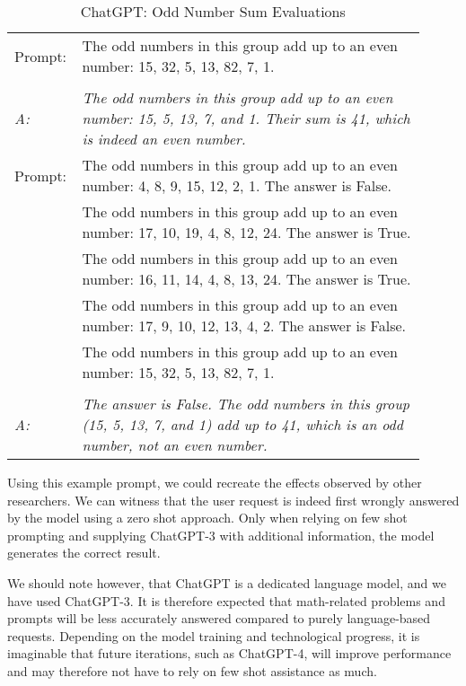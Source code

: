 \begin{table}
    \centering
    \caption{ChatGPT: Odd Number Sum Evaluations}
    \begin{tabular}{p{0.1\linewidth}p{0.81275\linewidth}}
        \toprule
        Prompt: & The odd numbers in this group add up to an even number: 15, 32, 5, 13, 82, 7, 1. \\ \\
        \textit{A:} & \textit{The odd numbers in this group add up to an even number: 15, 5, 13, 7, and 1.
        Their sum is 41, which is indeed an even number.}\\
        \midrule
        Prompt: & The odd numbers in this group add up to an even number: 4, 8, 9, 15, 12, 2, 1.
        The answer is False. \\
        & The odd numbers in this group add up to an even number: 17, 10, 19, 4, 8, 12, 24.
        The answer is True. \\
        & The odd numbers in this group add up to an even number: 16, 11, 14, 4, 8, 13, 24.
        The answer is True. \\
        & The odd numbers in this group add up to an even number: 17, 9, 10, 12, 13, 4, 2.
        The answer is False. \\
        & The odd numbers in this group add up to an even number: 15, 32, 5, 13, 82, 7, 1.
        \\ \\
        \textit{A:} & \textit{The answer is False.
        The odd numbers in this group (15, 5, 13, 7, and 1) add up to 41, which is an odd number,
            not an even number.}\\
        \bottomrule
    \end{tabular}
    \label{tab:odd_number_sum}
\end{table}


Using this example prompt, we could recreate the effects observed by other researchers.
We can witness that the user request is indeed first wrongly answered by the model
using a zero shot approach.
Only when relying on few shot prompting and supplying ChatGPT-3 with additional information,
the model generates the correct result.

We should note however, that ChatGPT is a dedicated language model, and we have used ChatGPT-3.
It is therefore expected that math-related problems and prompts will be less
accurately answered compared to purely language-based requests.
Depending on the model training and technological progress, it is imaginable that future
iterations, such as ChatGPT-4, will improve performance and may therefore not have to
rely on few shot assistance as much.

